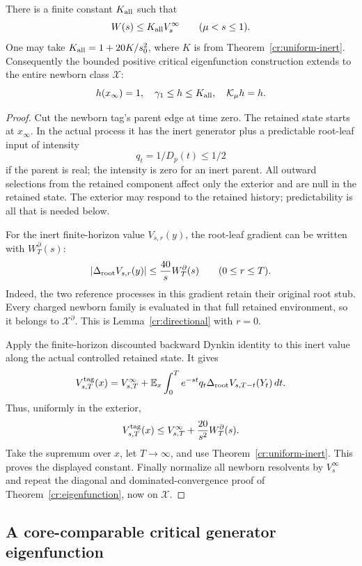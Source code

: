 \begin{theorem}
\label{cr:all-newborns}
There is a finite constant $K_{\rm all}$ such that
\[
 W(s)\le K_{\rm all}V_s^\infty
 \qquad(\mu<s\le1).
\]
One may take $K_{\rm all}=1+20K/s_0^2$, where $K$ is from
Theorem~\ref{cr:uniform-inert}.  Consequently the bounded positive
critical eigenfunction construction extends to the entire newborn
class $\mathcal X$:
\[
 h(x_\infty)=1,\quad\gamma_1\le h\le K_{\rm all},
 \quad\mathcal K_\mu h=h.
\]
\end{theorem}
\begin{proof}
Cut the newborn tag's parent edge at time zero.  The retained state
starts at $x_\infty$.  In the actual process it has the inert generator
plus a predictable root-leaf input of intensity
\[
 q_t=1/D_p(t)\le1/2
\]
if the parent is real; the intensity is zero for an inert parent.
All outward selections from the retained component affect only the
exterior and are null in the retained state.  The exterior may respond
to the retained history; predictability is all that is needed below.

For the inert finite-horizon value $V_{s,r}(y)$, the root-leaf gradient
can be written with $W_T^\partial(s)$:
\[
 |\Delta_{\rm root}V_{s,r}(y)|
 \le\frac{40}{s}W_T^\partial(s)\qquad(0\le r\le T).
\]
Indeed, the two reference processes in this gradient retain their
original root stub.  Every charged newborn family is evaluated in
that full retained environment, so it belongs to
$\mathcal X^\partial$.  This is Lemma~\ref{cr:directional} with $r=0$.

Apply the finite-horizon discounted backward Dynkin identity to this
inert value along the actual controlled retained state.  It gives
\[
 V_{s,T}^{\rm tag}(x)=V_{s,T}^\infty+
 \mathbb E_x\int_0^T e^{-st}q_t
       \Delta_{\rm root}V_{s,T-t}(Y_t)\,dt.
\]
Thus, uniformly in the exterior,
\[
 V_{s,T}^{\rm tag}(x)
 \le V_{s,T}^\infty+\frac{20}{s^2}W_T^\partial(s).
\]
Take the supremum over $x$, let $T\to\infty$, and use
Theorem~\ref{cr:uniform-inert}.  This proves the displayed constant.
Finally normalize all newborn resolvents by $V_s^\infty$ and repeat
the diagonal and dominated-convergence proof of
Theorem~\ref{cr:eigenfunction}, now on $\mathcal X$.
\end{proof}

\subsection{A core-comparable critical generator eigenfunction}


